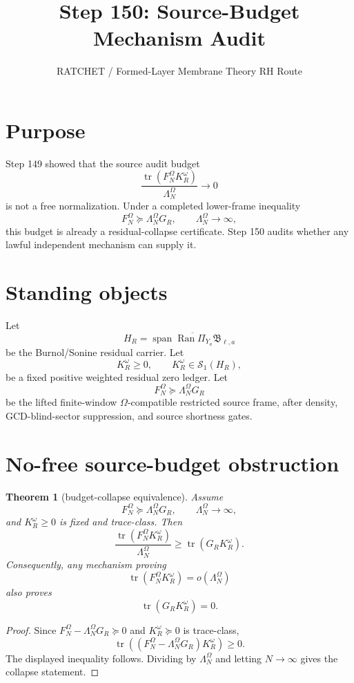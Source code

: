 \documentclass[11pt]{article}
\title{Step 150: Source-Budget Mechanism Audit}
\author{RATCHET / Formed-Layer Membrane Theory RH Route}
\date{}
\newtheorem{theorem}{Theorem}
\begin{document}
\maketitle

\section{Purpose}
Step 149 showed that the source audit budget
\[
  \frac{\operatorname{tr}(F_N^\Omega K_R^\omega)}{\Lambda_N^\Omega}\to 0
\]
is not a free normalization.  Under a completed lower-frame inequality
\[
  F_N^\Omega \succeq \Lambda_N^\Omega G_R,
  \qquad \Lambda_N^\Omega\to\infty,
\]
this budget is already a residual-collapse certificate.  Step 150 audits whether any lawful independent mechanism can supply it.

\section{Standing objects}
Let
\[
  H_R=\overline{\operatorname{span}\operatorname{Ran}\Pi_{Y_a}\mathfrak B_{\ell,a}}
\]
be the Burnol/Sonine residual carrier.  Let
\[
  K_R^\omega\ge 0,
  \qquad K_R^\omega\in\mathcal S_1(H_R),
\]
be a fixed positive weighted residual zero ledger.  Let
\[
  F_N^\Omega\succeq \Lambda_N^\Omega G_R
\]
be the lifted finite-window \(\Omega\)-compatible restricted source frame, after density, GCD-blind-sector suppression, and source shortness gates.

\section{No-free source-budget obstruction}
\begin{theorem}[budget-collapse equivalence]
Assume
\[
  F_N^\Omega\succeq \Lambda_N^\Omega G_R,
  \qquad \Lambda_N^\Omega\to\infty,
\]
and \(K_R^\omega\ge0\) is fixed and trace-class. Then
\[
  \frac{\operatorname{tr}(F_N^\Omega K_R^\omega)}{\Lambda_N^\Omega}
  \ge
  \operatorname{tr}(G_RK_R^\omega).
\]
Consequently, any mechanism proving
\[
  \operatorname{tr}(F_N^\Omega K_R^\omega)=o(\Lambda_N^\Omega)
\]
also proves
\[
  \operatorname{tr}(G_RK_R^\omega)=0.
\]
\end{theorem}

\begin{proof}
Since \(F_N^\Omega-\Lambda_N^\Omega G_R\succeq0\) and \(K_R^\omega\succeq0\) is trace-class,
\[
  \operatorname{tr}((F_N^\Omega-\Lambda_N^\Omega G_R)K_R^\omega)\ge0.
\]
The displayed inequality follows.  Dividing by \(\Lambda_N^\Omega\) and letting \(N\to\infty\) gives the collapse statement.
\end{proof}
\end{document}
